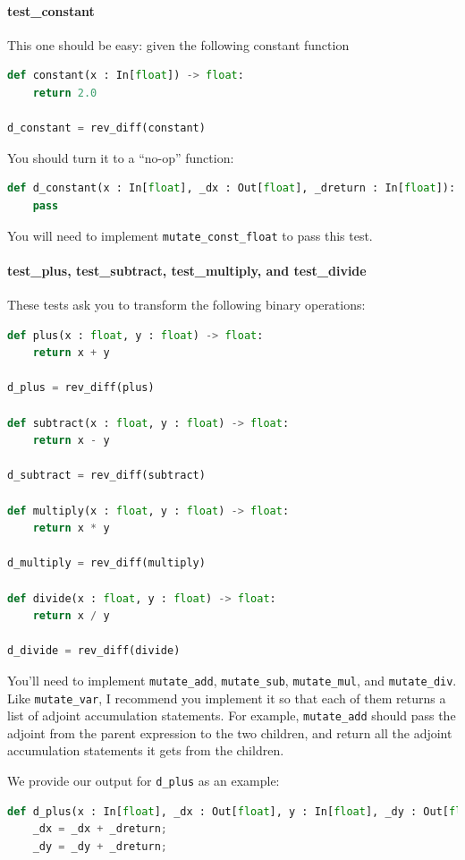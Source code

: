 \paragraph{test_constant} This one should be easy: given the following constant function
\begin{lstlisting}[language=Python]
def constant(x : In[float]) -> float:
    return 2.0

d_constant = rev_diff(constant)
\end{lstlisting}
You should turn it to a ``no-op'' function:
\begin{lstlisting}[language=Python]
def d_constant(x : In[float], _dx : Out[float], _dreturn : In[float]):
	pass
\end{lstlisting}
You will need to implement \lstinline{mutate_const_float} to pass this test.

\paragraph{test_plus, test_subtract, test_multiply, and test_divide} These tests ask you to transform the following binary operations:
\begin{lstlisting}[language=Python]
def plus(x : float, y : float) -> float:
    return x + y

d_plus = rev_diff(plus)

def subtract(x : float, y : float) -> float:
    return x - y

d_subtract = rev_diff(subtract)

def multiply(x : float, y : float) -> float:
    return x * y

d_multiply = rev_diff(multiply)

def divide(x : float, y : float) -> float:
    return x / y

d_divide = rev_diff(divide)
\end{lstlisting}

You'll need to implement \lstinline{mutate_add}, \lstinline{mutate_sub}, \lstinline{mutate_mul}, and \lstinline{mutate_div}. Like \lstinline{mutate_var}, I recommend you implement it so that each of them returns a list of adjoint accumulation statements. For example, \lstinline{mutate_add} should pass the adjoint from the parent expression to the two children, and return all the adjoint accumulation statements it gets from the children.

We provide our output for \lstinline{d_plus} as an example:
\begin{lstlisting}[language=Python]
def d_plus(x : In[float], _dx : Out[float], y : In[float], _dy : Out[float], _dreturn : In[float]):
	_dx = _dx + _dreturn;
	_dy = _dy + _dreturn;
\end{lstlisting}

